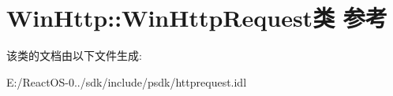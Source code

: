 \hypertarget{class_win_http_1_1_win_http_request}{}\section{Win\+Http\+:\+:Win\+Http\+Request类 参考}
\label{class_win_http_1_1_win_http_request}


该类的文档由以下文件生成\+:\begin{DoxyCompactItemize}
\item 
E\+:/\+React\+O\+S-\/0../sdk/include/psdk/httprequest.\+idl\end{DoxyCompactItemize}
